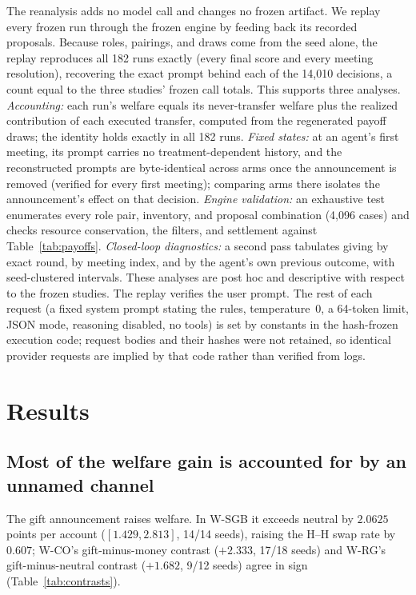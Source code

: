 \documentclass[sigconf,anonymous]{aamas}
\begin{document}
The reanalysis adds no model call and changes no frozen artifact.  We replay
every frozen run through the frozen engine by feeding back its recorded
proposals.  Because roles, pairings, and draws come from the seed alone, the
replay reproduces all 182 runs exactly (every final score and every meeting
resolution), recovering the exact prompt behind each of the 14,010 decisions, a
count equal to the three studies' frozen call totals.  This supports three
analyses.  \emph{Accounting:} each run's welfare equals its never-transfer
welfare plus the realized contribution of each executed transfer, computed from
the regenerated payoff draws; the identity holds exactly in all 182 runs.
\emph{Fixed states:} at an agent's first meeting, its prompt carries no
treatment-dependent history, and the reconstructed prompts are byte-identical
across arms once the announcement is removed (verified for every first
meeting); comparing arms there isolates the announcement's effect on that
decision.  \emph{Engine validation:} an exhaustive test enumerates every role
pair, inventory, and proposal combination (4,096 cases) and checks resource
conservation, the filters, and settlement against Table~\ref{tab:payoffs}.
\emph{Closed-loop diagnostics:} a second pass tabulates giving by exact round,
by meeting index, and by the agent's own previous outcome, with seed-clustered
intervals.  These analyses are post hoc and descriptive with respect to the
frozen studies.  The replay verifies the user prompt.  The rest of each request
(a fixed system prompt stating the rules, temperature~0, a 64-token limit, JSON
mode, reasoning disabled, no tools) is set by constants in the hash-frozen
execution code; request bodies and their hashes were not retained, so identical
provider requests are implied by that code rather than verified from logs.

\section{Results}

\subsection{Most of the welfare gain is accounted for by an unnamed channel}
\label{sec:welfare}

The gift announcement raises welfare.  In W-SGB it exceeds neutral by
$2.0625$ points per account ($[1.429,2.813]$, 14/14 seeds), raising the H--H
swap rate by $0.607$; W-CO's gift-minus-money contrast ($+2.333$, 17/18 seeds)
and W-RG's gift-minus-neutral contrast ($+1.682$, 9/12 seeds) agree in sign
(Table~\ref{tab:contrasts}).
\end{document}
